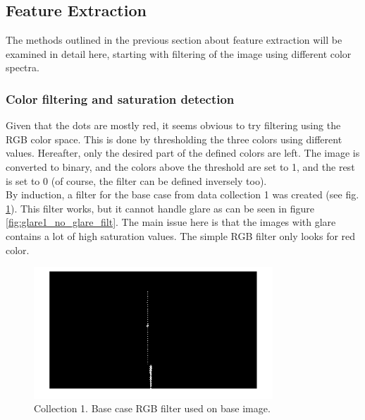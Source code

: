 
\subsection{Feature Extraction}
The methods outlined in the previous section about feature extraction will be examined in detail here, starting with filtering of the image using different color spectra.




\subsubsection{Color filtering and saturation detection}
Given that the dots are mostly red, it seems obvious to try filtering using the RGB color space. This is done by thresholding the three colors using different values. Hereafter, only the desired part of the defined colors are left. The image is converted to binary, and the colors above the threshold are set to 1, and the rest is set to 0 (of course, the filter can be defined inversely too). \\
By induction, a filter for the base case from data collection 1 was created (see fig. \ref{fig:base1_no_glare_filt}). This filter works, but it cannot handle glare as can be seen in figure \ref{fig:glare1_no_glare_filt}. The main issue here is that the images with glare contains a lot of high saturation values. The simple RGB filter only looks for red color. 
\begin{figure}[h]
    \centering
    \includegraphics[width=0.8\textwidth]{figures/ImageAnalysis/filtered_base1_noglarefilt.png}
    \caption{Collection 1. Base case RGB filter used on base image.}
    \label{fig:base1_no_glare_filt}
\end{figure}
\FloatBarrier
